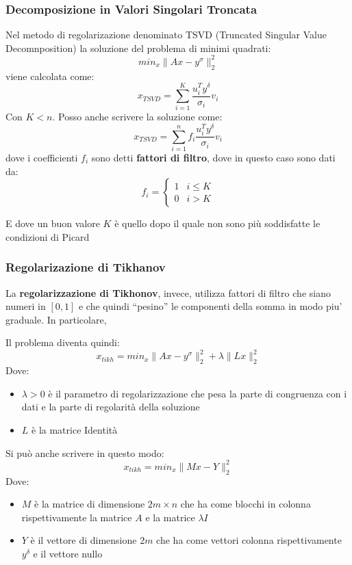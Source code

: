 \subsubsection{Decomposizione in Valori Singolari Troncata}

Nel metodo di regolarizazione denominato TSVD (Truncated Singular Value Decomnposition) la soluzione del problema di minimi quadrati: 
\[
    min_x \|Ax - y^\sigma\|_2^2    
\]
viene calcolata come:
\[
    x_{TSVD} = \sum_{i=1}^{K} \frac{u_i^T y^\delta}{\sigma_i} v_i  
\]
Con $K < n$.
Posso anche scrivere la soluzione come:
\[
    x_{TSVD} = \sum_{i=1}^{n} f_i\frac{u_i^T y^\delta}{\sigma_i} v_i  
\]
dove i coefficienti $f_i$ sono detti \textbf{fattori di filtro}, dove in questo caso sono dati da:
\[
    f_i = \begin{cases}
        1 & i\leq K\\
        0 &  i>K
    \end{cases}    
\]

E dove un buon valore $K$ è quello dopo il quale non sono più soddisfatte le condizioni di Picard 

\subsubsection{Regolarizazione di Tikhanov}
La \textbf{regolarizzazione di Tikhonov}, invece, utilizza fattori di filtro che siano numeri in
$[0, 1]$ e che quindi “pesino” le componenti della somma in modo piu’ graduale. In
particolare,

Il problema diventa quindi:
\[
    x_{tikh} =  min_x \|Ax - y^\sigma\|_2^2   + \lambda\|Lx\|_2^2
\]
Dove:
\begin{itemize}
    \item $\lambda>0$ è il parametro di regolarizzazione che pesa la parte di congruenza con i dati e la parte di regolarità della soluzione
    \item $L$ è la matrice Identità
\end{itemize}

Si può anche scrivere in questo modo:
\[
    x_{tikh} =  min_x \|Mx - Y\|_2^2 
\]
Dove:\begin{itemize}
    \item $M$ è la matrice di dimensione $2m \times n$ che ha come blocchi in colonna rispettivamente la matrice $A$ e la matrice $\lambda I$
    \item $Y$ è il vettore di dimensione $2m$ che ha
    come vettori colonna rispettivamente $y^\delta$ e il vettore nullo
\end{itemize}

